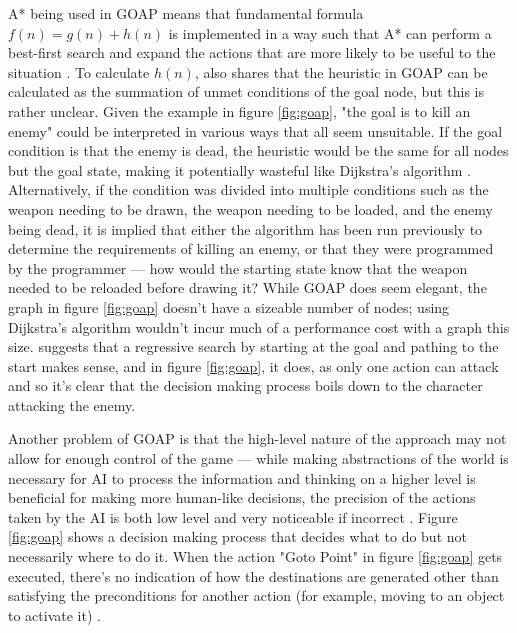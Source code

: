 \documentclass[11pt, a4paper]{report}
\begin{document}
A* being used in GOAP means that fundamental formula $f(n) = g(n) + h(n)$ \parencite[102]{hart1968formal} is implemented in a way such that A* can perform a best-first search and expand the actions that are more likely to be  useful to the situation \parencite[7]{orkin2003applying}. To calculate $h(n)$, \citeauthor{orkin2003applying} \parencite*[7]{orkin2003applying} also shares that the heuristic in GOAP can be calculated as the summation of unmet conditions of the goal node, but this is rather unclear. Given the example in figure \ref{fig:goap}, "the goal is to kill an enemy" \parencite[3]{orkin2003applying} could be interpreted in various ways that all seem unsuitable. If the goal condition is that the enemy is dead, the heuristic would be the same for all nodes but the goal state, making it potentially wasteful like Dijkstra's algorithm \parencite[214]{millington2019ai}. Alternatively, if the condition was divided into multiple conditions such as the weapon needing to be drawn, the weapon needing to be loaded, and the enemy being dead, it is implied that either the algorithm has been run previously to determine the requirements of killing an enemy, or that they were programmed by the programmer --- how would the starting state know that the weapon needed to be reloaded before drawing it? While GOAP does seem elegant, the graph in figure \ref{fig:goap} doesn't have a sizeable number of nodes; using Dijkstra's algorithm wouldn't incur much of a performance cost with a graph this size. \citeauthor{orkin2003applying} \parencite*{orkin2003applying} suggests that a regressive search by starting at the goal and pathing to the start makes sense, and in figure \ref{fig:goap}, it does, as only one action can attack and so it's clear that the decision making process boils down to the character attacking the enemy.

Another problem of GOAP is that the high-level nature of the approach may not allow for enough control of the game \parencite[87]{stanciu2012implementing} --- while making abstractions of the world is necessary for AI to process the information \parencite[2]{buro2004call} and thinking on a higher level is beneficial for making more human-like decisions, the precision of the actions taken by the AI is both low level and very noticeable if incorrect \parencite[60]{graham2003pathfinding}. Figure \ref{fig:goap} shows a decision making process that decides what to do but not necessarily where to do it. When the action "Goto Point" in figure \ref{fig:goap} gets executed, there's no indication of how the destinations are generated other than satisfying the preconditions for another action (for example, moving to an object to activate it) \parencite[7]{orkin2003applying}. 
\end{document}
